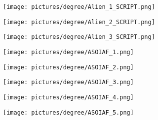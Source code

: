 \begin{figure}
        \centering
        \begin{subfigure}{.49\textwidth}
                \centering
                \texttt{[image: pictures/degree/Alien\_1\_SCRIPT.png]}
        \end{subfigure}
        \begin{subfigure}{.49\textwidth}
                \centering
                \texttt{[image: pictures/degree/Alien\_2\_SCRIPT.png]}
        \end{subfigure}
\end{figure}
\begin{figure} \ContinuedFloat
        \centering
        \begin{subfigure}{.49\textwidth}
                \centering
                \texttt{[image: pictures/degree/Alien\_3\_SCRIPT.png]}
        \end{subfigure}
        \begin{subfigure}{.49\textwidth}
                \centering
                \texttt{[image: pictures/degree/ASOIAF\_1.png]}
        \end{subfigure}
\end{figure}
\begin{figure} \ContinuedFloat
        \centering
        \begin{subfigure}{.49\textwidth}
                \centering
                \texttt{[image: pictures/degree/ASOIAF\_2.png]}
        \end{subfigure}
        \begin{subfigure}{.49\textwidth}
                \centering
                \texttt{[image: pictures/degree/ASOIAF\_3.png]}
        \end{subfigure}
\end{figure}
\begin{figure} \ContinuedFloat
        \centering
        \begin{subfigure}{.49\textwidth}
                \centering
                \texttt{[image: pictures/degree/ASOIAF\_4.png]}
        \end{subfigure}
        \begin{subfigure}{.49\textwidth}
                \centering
                \texttt{[image: pictures/degree/ASOIAF\_5.png]}
        \end{subfigure}
\end{figure}
